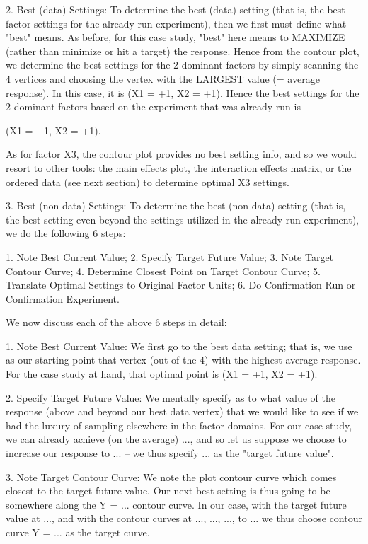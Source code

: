 2. Best (data) Settings:
   To determine the best (data) setting (that is,
   the best factor settings for the already-run
   experiment), then we first must define what
   "best" means.  As before, for this case study,
   "best" here means to MAXIMIZE (rather than
   minimize or hit a target) the response.  Hence
   from the contour plot, we determine the best
   settings for the 2 dominant factors by simply
   scanning the 4 vertices and choosing the vertex
   with the LARGEST value (= average response).
   In this case, it is (X1 = +1, X2 = +1).  Hence
   the best settings for the 2 dominant factors
   based on the experiment that was already run is

      (X1 = +1, X2 = +1).

   As for factor X3, the contour plot provides no
   best setting info, and so we would resort to
   other tools: the main effects plot, the
   interaction effects matrix, or the ordered data
   (see next section) to determine optimal X3
   settings.

3. Best (non-data) Settings:
   To determine the best (non-data) setting (that
   is, the best setting even beyond the settings
   utilized in the already-run experiment), we do
   the following 6 steps:

      1. Note Best Current Value;
      2. Specify Target Future Value;
      3. Note Target Contour Curve;
      4. Determine Closest Point on Target Contour Curve;
      5. Translate Optimal Settings to Original Factor Units;
      6. Do Confirmation Run or Confirmation Experiment.

   We now discuss each of the above 6 steps in detail:

      1. Note Best Current Value:
         We first go to the best data setting;
         that is, we use as our starting point
         that vertex (out of the 4) with the
         highest average response.  For the case
         study at hand, that optimal point is
         (X1 = +1, X2 = +1).

      2. Specify Target Future Value:
         We mentally specify as to what value of
         the response (above and beyond our best
         data vertex) that we would like to see if we
         had the luxury of sampling elsewhere
         in the factor domains.
         For our case study, we can already
         achieve (on the average) ..., and so let us suppose we
         choose to increase our response to ... --
         we thus specify ... as the "target future value".

      3. Note Target Contour Curve:
         We note the plot contour curve which comes
         closest to the target future value.  Our
         next best setting is thus going to be
         somewhere along the Y = ...  contour
         curve.
         In our case, with the target future value at ...,
         and with the contour curves at ..., ..., ..., to ...
         we thus choose contour curve Y = ... as the target curve.

